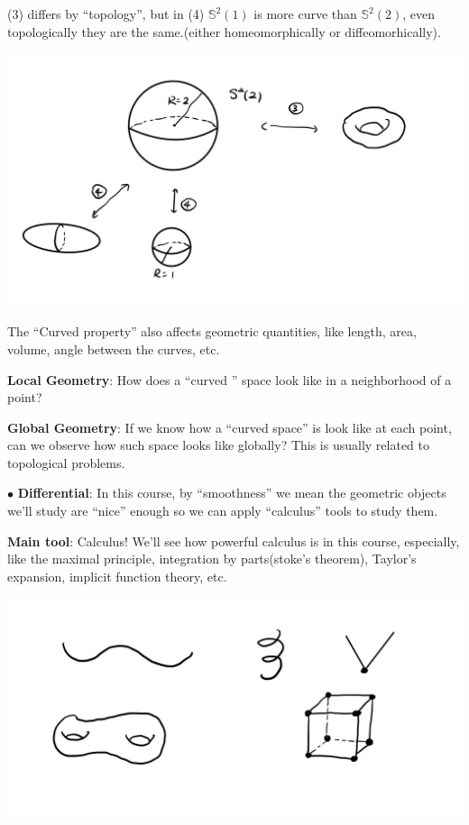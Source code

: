 \begin{exam}
    (3) differs by ``topology'', but in (4) $\mathbb{S}^2(1)$ is more curve than $\mathbb{S}^2(2)$, even topologically they are the same.(either homeomorphically or diffeomorhically).
\end{exam}

\begin{center}
    \includegraphics[scale=0.2]{picture/preface_example2.jpg}
\end{center}

The ``Curved property'' also affects geometric quantities, like length, area, volume, angle between the curves, etc.

\textbf{Local Geometry}: How does a ``curved '' space look like in a neighborhood of a point?
 
\textbf{Global Geometry}: If we know how a ``curved space'' is look like at each point, can we observe how such space looks like globally? This is usually related to topological problems.

$\bullet$ \textbf{Differential}: In this course, by ``smoothness'' we mean the geometric objects we'll study are ``nice'' enough so we can apply ``calculus'' tools to study them.

\textbf{Main tool}: Calculus! We'll see how powerful calculus is in this course, especially, like the maximal principle, integration by parts(stoke's theorem), Taylor's expansion, implicit function theory, etc.

\begin{center}
    \includegraphics[scale=0.2]{picture/preface_example3.jpg}
\end{center}

